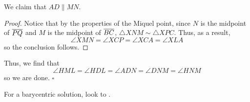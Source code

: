 \documentclass{article}
\begin{document}
\begin{claim*}
We claim that $AD \parallel MN$.
\end{claim*}
\begin{proof}
Notice that by the properties of the Miquel point, since $N$ is the midpoint of $\overline{PQ}$ and $M$ is the midpoint of $\overline{BC}$, $\triangle XNM \sim \triangle XPC$. Thus, as a result, \[\angle XMN = \angle XCP = \angle XCA = \angle XLA\] so the conclusion follows.
\end{proof}

Thus, we find that \[\angle HML = \angle HDL = \angle ADN = \angle DNM = \angle HNM\] so we are done. $\square$

\begin{remark*}
For a barycentric solution, look to .
\end{remark*}
\end{document}
